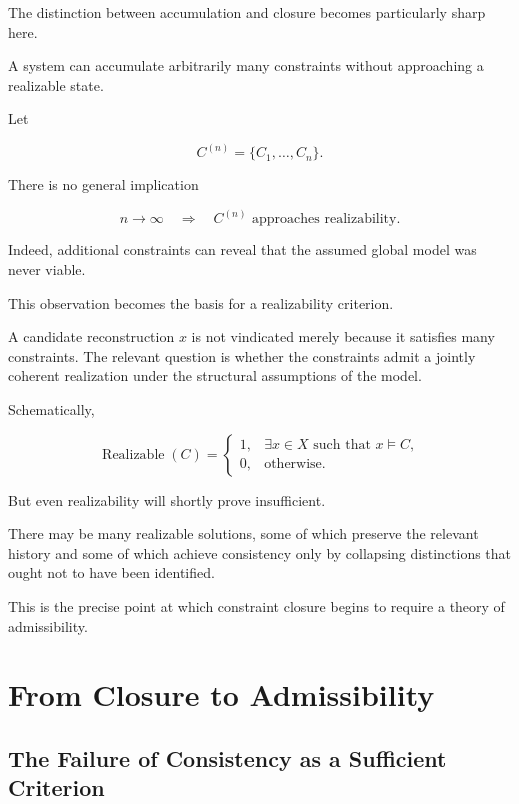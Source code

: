 \documentclass[11pt]{article}
\theoremstyle{remark}
\begin{document}
The distinction between accumulation and closure becomes particularly sharp here.

A system can accumulate arbitrarily many constraints without approaching a realizable state.

Let

\begin{equation}
C^{(n)}
=
\{C_1,\ldots,C_n\}.
\end{equation}

There is no general implication

\begin{equation}
n\rightarrow\infty
\quad\Rightarrow\quad
C^{(n)}
\text{ approaches realizability}.
\end{equation}

Indeed, additional constraints can reveal that the assumed global model was never viable.

This observation becomes the basis for a realizability criterion.

A candidate reconstruction $x$ is not vindicated merely because it satisfies many constraints. The relevant question is whether the constraints admit a jointly coherent realization under the structural assumptions of the model.

Schematically,

\begin{equation}
\operatorname{Realizable}(C)
=
\begin{cases}
1,
&
\exists x\in X
\text{ such that }
x\models C,\\
0,
&
\text{otherwise}.
\end{cases}
\end{equation}

But even realizability will shortly prove insufficient.

There may be many realizable solutions, some of which preserve the relevant history and some of which achieve consistency only by collapsing distinctions that ought not to have been identified.

This is the precise point at which constraint closure begins to require a theory of admissibility.

\section{From Closure to Admissibility}

\subsection{The Failure of Consistency as a Sufficient Criterion}
\end{document}
